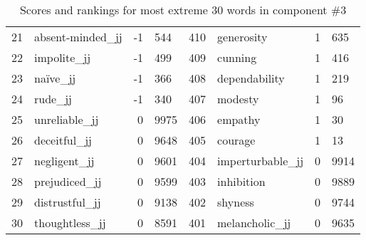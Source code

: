 \begin{table}[tbp]
\begin{tabular}{| rlr@{.}l | rlr@{.}l |}
    21 & absent-minded\_jj & -1 & 544    &    410 & generosity & 1 & 635 \\
    22 & impolite\_jj & -1 & 499    &    409 & cunning & 1 & 416 \\
    23 & naïve\_jj & -1 & 366    &    408 & dependability & 1 & 219 \\
    24 & rude\_jj & -1 & 340    &    407 & modesty & 1 & 96 \\
    25 & unreliable\_jj & 0 & 9975    &    406 & empathy & 1 & 30 \\
    26 & deceitful\_jj & 0 & 9648    &    405 & courage & 1 & 13 \\
    27 & negligent\_jj & 0 & 9601    &    404 & imperturbable\_jj & 0 & 9914 \\
    28 & prejudiced\_jj & 0 & 9599    &    403 & inhibition & 0 & 9889 \\
    29 & distrustful\_jj & 0 & 9138    &    402 & shyness & 0 & 9744 \\
    30 & thoughtless\_jj & 0 & 8591    &    401 & melancholic\_jj & 0 & 9635 \\
    \hline
    \end{tabular}
    \caption{Scores and rankings for most extreme 30 words in component \#3} 
\end{table}
\clearpage
